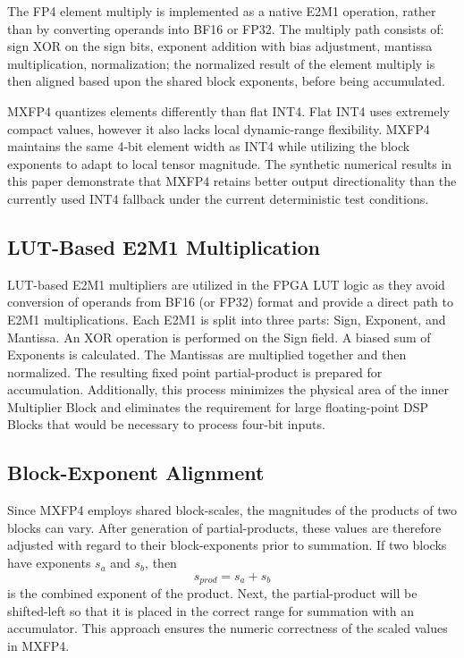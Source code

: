 \documentclass[conference]{IEEEtran}
\begin{document}
The FP4 element multiply is implemented as a native E2M1 operation, rather than by converting operands into BF16 or FP32. The multiply path consists of: sign XOR on the sign bits, exponent addition with bias adjustment, mantissa multiplication, normalization; the normalized result of the element multiply is then aligned based upon the shared block exponents, before being accumulated.

MXFP4 quantizes elements differently than flat INT4. Flat INT4 uses extremely compact values, however it also lacks local dynamic-range flexibility. MXFP4 maintains the same 4-bit element width as INT4 while utilizing the block exponents to adapt to local tensor magnitude. The synthetic numerical results in this paper demonstrate that MXFP4 retains better output directionality than the currently used INT4 fallback under the current deterministic test conditions.

\subsection{LUT-Based E2M1 Multiplication}
LUT-based E2M1 multipliers are utilized in the FPGA LUT logic as they avoid conversion of operands from BF16 (or FP32) format and provide a direct path to E2M1 multiplications. Each E2M1 is split into three parts: Sign, Exponent, and Mantissa. An XOR operation is performed on the Sign field. A biased sum of Exponents is calculated. The Mantissas are multiplied together and then normalized. The resulting fixed point partial-product is prepared for accumulation. Additionally, this process minimizes the physical area of the inner Multiplier Block and eliminates the requirement for large floating-point DSP Blocks that would be necessary to process four-bit inputs.

\subsection{Block-Exponent Alignment}
Since MXFP4 employs shared block-scales, the magnitudes of the products of two blocks can vary. After generation of partial-products, these values are therefore adjusted with regard to their block-exponents prior to summation. If two blocks have exponents $s_a$ and $s_b$, then
\begin{equation}
s_{prod} = s_a + s_b
\end{equation}
is the combined exponent of the product. Next, the partial-product will be shifted-left so that it is placed in the correct range for summation with an accumulator. This approach ensures the numeric correctness of the scaled values in MXFP4.
\end{document}
